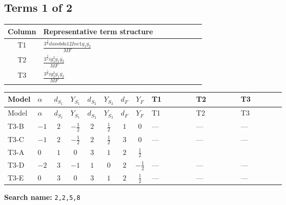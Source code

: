 \documentclass[8pt]{article}
\begin{document}
\begin{landscape}
\subsection*{Terms 1 of 2}
\begin{center}
\begin{tabular}{@{}c >{\raggedright\arraybackslash}p{0.82\linewidth}@{}}
\toprule
Column & Representative term structure \\
\midrule
T1 & \(\displaystyle \frac{3^{\frac{3}{4}} i lambda12Inv1 \overline{y_{1}} \overline{y_{2}}}{MF}\) \\
\midrule
T2 & \(\displaystyle \frac{3^{\frac{3}{4}} i g_{1}^{2} \overline{y_{1}} \overline{y_{2}}}{MF}\) \\
\midrule
T3 & \(\displaystyle \frac{3^{\frac{3}{4}} i g_{2}^{2} \overline{y_{1}} \overline{y_{2}}}{MF}\) \\
\midrule
\bottomrule
\end{tabular}
\end{center}
\smallskip
\tiny
\begin{longtable}{@{}llcccccc >{\raggedright\arraybackslash}p{0.21\linewidth} >{\raggedright\arraybackslash}p{0.21\linewidth} >{\raggedright\arraybackslash}p{0.21\linewidth}@{}}
\toprule
Model & $\alpha$ & $d_{S_1}$ & $Y_{S_1}$ & $d_{S_2}$ & $Y_{S_2}$ & $d_F$ & $Y_F$ & T1 & T2 & T3 \\
\midrule
\endfirsthead
\toprule
Model & $\alpha$ & $d_{S_1}$ & $Y_{S_1}$ & $d_{S_2}$ & $Y_{S_2}$ & $d_F$ & $Y_F$ & T1 & T2 & T3 \\
\midrule
\endhead
T3-B & $-1$ & $2$ & $-\frac{1}{2}$ & $2$ & $\frac{1}{2}$ & $1$ & $0$ & --- & --- & --- \\
\midrule
T3-C & $-1$ & $2$ & $-\frac{1}{2}$ & $2$ & $\frac{1}{2}$ & $3$ & $0$ & --- & --- & --- \\
\midrule
T3-A & $0$ & $1$ & $0$ & $3$ & $1$ & $2$ & $\frac{1}{2}$ & \scriptsize\adjustbox{max width=\linewidth}{$\begin{gathered} \frac{3^{\frac{3}{4}} i lambda12Inv1 \overline{y_{1}} \overline{y_{2}}}{6 MF}\end{gathered}$} & \scriptsize\adjustbox{max width=\linewidth}{$\begin{gathered} \frac{3^{\frac{3}{4}} i g_{1}^{2} \overline{y_{1}} \overline{y_{2}}}{8 MF}\end{gathered}$} & \scriptsize\adjustbox{max width=\linewidth}{$\begin{gathered} \frac{17 \cdot 3^{\frac{3}{4}} i g_{2}^{2} \overline{y_{1}} \overline{y_{2}}}{24 MF}\end{gathered}$} \\
\midrule
T3-D & $-2$ & $3$ & $-1$ & $1$ & $0$ & $2$ & $-\frac{1}{2}$ & --- & --- & --- \\
\midrule
T3-E & $0$ & $3$ & $0$ & $3$ & $1$ & $2$ & $\frac{1}{2}$ & --- & --- & --- \\
\midrule
\bottomrule
\end{longtable}
\clearpage
\noindent\textbf{Search name: }\texttt{2,2,5,8}\par\smallskip

\end{landscape}
\end{document}
